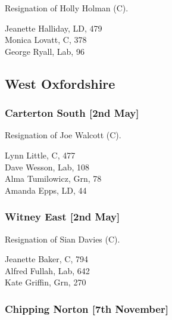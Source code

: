 \documentclass[a4paper,openany,10pt]{book}
\begin{document}
Resignation of Holly Holman (C).



Jeanette Halliday, LD, 479\\
Monica Lovatt, C, 378\\
George Ryall, Lab, 96\\


\subsection*{West Oxfordshire}

\subsubsection*{Carterton South \hspace*{\fill}\nolinebreak[1]%
\enspace\hspace*{\fill}
[2nd May]}


Resignation of Joe Walcott (C).



Lynn Little, C, 477\\
Dave Wesson, Lab, 108\\
Alma Tumilowicz, Grn, 78\\
Amanda Epps, LD, 44\\


\subsubsection*{Witney East \hspace*{\fill}\nolinebreak[1]%
\enspace\hspace*{\fill}
[2nd May]}


Resignation of Sian Davies (C).



Jeanette Baker, C, 794\\
Alfred Fullah, Lab, 642\\
Kate Griffin, Grn, 270\\


\subsubsection*{Chipping Norton \hspace*{\fill}\nolinebreak[1]%
\enspace\hspace*{\fill}
[7th November]}
\end{document}
